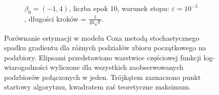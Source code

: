 \begin{figure}[hbt!]
\begin{center}
\begin{subfigure}[h!]{0.9\textwidth}
            \caption{$\beta_0=(-1,4)$, liczba epok 10, warunek stopu: $\varepsilon=10^{-5}$, długości kroków = $\frac{1}{20\sqrt{t}}$.}
   \end{subfigure}  
      \end{center}
  \caption[Porównanie estymacji w modelu Coxa metodą stochastycznego spadku gradientu dla różnych podziałów zbioru początkowego na podzbiory.]{\label{rysCox4}Porównanie estymacji w modelu Coxa metodą stochastycznego spadku gradientu dla różnych podziałów zbioru początkowego na podzbiory. Elipsami przedstawiono warstwice częściowej funkcji log-wiarogodności wyliczone dla wszystkich zaobserwowanych podzbiorów połączonych w jeden. Trójkątem zaznaczono punkt startowy algorytmu, kwadratem zaś teoretyczne maksimum.}
\end{figure}